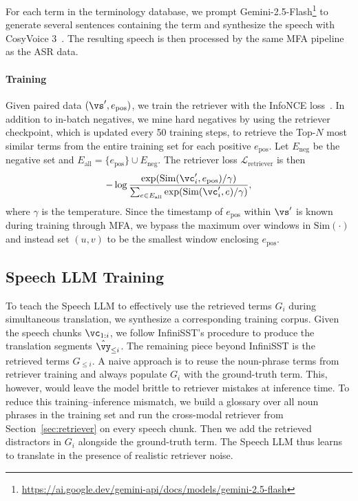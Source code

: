 For each term in the terminology database, we prompt Gemini-2.5-Flash\footnote{\url{https://ai.google.dev/gemini-api/docs/models/gemini-2.5-flash}} to generate several sentences containing the term and synthesize the speech with CosyVoice 3~\citep{du2025cosyvoice}. The resulting speech is then processed by the same MFA pipeline as the ASR data.

\paragraph{Training} 
Given paired data $(\vs', e_\text{pos})$, we train the retriever with the InfoNCE loss~\citep{oord2019representationlearningcontrastivepredictive}. In addition to in-batch negatives, we mine hard negatives by using the retriever checkpoint, which is updated every 50 training steps, to retrieve the Top-$N$ most similar terms from the entire training set for each positive $e_\text{pos}$.
Let $E_\text{neg}$ be the negative set and $E_\text{all} = \{e_\text{pos}\} \cup E_\text{neg}$. The retriever loss $\mathcal{L}_{\mathrm{retriever}}$ is then \begin{equation} 
-\log \frac{ \exp(\text{Sim}(\vc_i',e_\text{pos})/\gamma) }{ \sum_{e\in E_\text{all}} \exp(\text{Sim}(\vc_i',e)/\gamma) },
\end{equation} where $\gamma$ is the temperature. 
Since the timestamp of $e_\text{pos}$ within $\vs'$ is known during training through MFA, we bypass the maximum over windows in $\text{Sim}(\cdot)$ and instead set $(u, v)$ to be the smallest window enclosing $e_\text{pos}$.


\subsection{Speech LLM Training}
\label{sec:rag_sst_generator}

To teach the Speech LLM to effectively use the retrieved terms $G_i
$ during simultaneous translation, we synthesize a corresponding training corpus. Given the speech chunks $\vc_{1:i}$, we follow InfiniSST's procedure to produce the translation segments $\hat{\vy}_{\leq i}$. The remaining piece beyond InfiniSST is the retrieved terms $G_{\leq i}$. A naive approach is to reuse the noun-phrase terms from retriever training and always populate $G_i$ with the ground-truth term. This, however, would leave the model brittle to retriever mistakes at inference time. To reduce this training–inference mismatch, we build a glossary over all noun phrases in the training set and run the cross-modal retriever from Section~\ref{sec:retriever} on every speech chunk. Then we add the retrieved distractors in $G_i$ alongside the ground-truth term. The Speech LLM thus learns to translate in the presence of realistic retriever noise.

